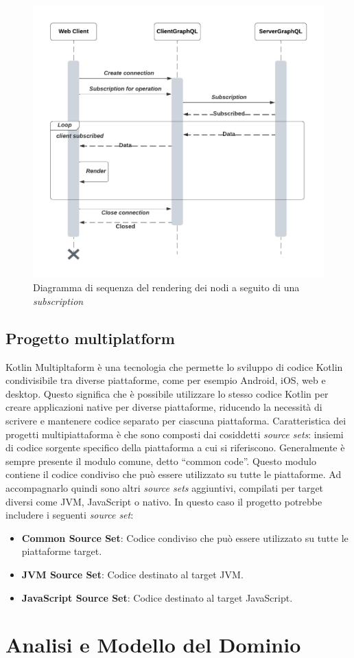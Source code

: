 \begin{figure}
	\centering
	\includegraphics[width=.9\linewidth]{imgs/Rendering_Diagramma_Sequenza.pdf}
	\caption{Diagramma di sequenza del rendering dei nodi a seguito di una \textit{subscription}}
	\label{fig:rendering-graphics}
\end{figure}

\subsection{Progetto multiplatform}
Kotlin Multipltaform è una tecnologia che permette lo sviluppo di codice Kotlin condivisibile tra diverse piattaforme, come per esempio Android, iOS, web e desktop. Questo significa che è possibile utilizzare lo stesso codice Kotlin per creare applicazioni native per diverse piattaforme, riducendo la necessità di scrivere e mantenere codice separato per ciascuna piattaforma. 
Caratteristica dei progetti multipiattaforma è che sono composti dai cosiddetti \textit{source sets}: insiemi di codice sorgente specifico della piattaforma a cui si riferiscono. Generalmente è sempre presente il modulo comune, detto ``common code''. Questo modulo contiene il codice condiviso che può essere utilizzato su tutte le piattaforme. Ad accompagnarlo quindi sono altri \textit{source sets} aggiuntivi, compilati per target diversi come JVM, JavaScript o nativo. In questo caso il progetto potrebbe includere i seguenti \textit{source set}:
\begin{itemize}
	\item \textbf{Common Source Set}: Codice condiviso che può essere utilizzato su tutte le piattaforme target.
	\item \textbf{JVM Source Set}: Codice destinato al target JVM.
	\item \textbf{JavaScript Source Set}: Codice destinato al target JavaScript.
\end{itemize}


\section{Analisi e Modello del Dominio}
